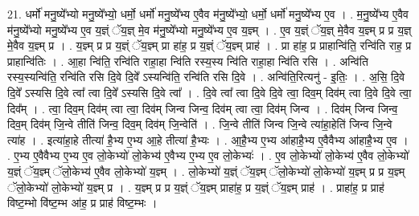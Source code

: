 \documentclass[17pt]{extarticle}
\begin{document}
21. धर्मो॑ मनु॒ष्ये᳚भ्यो मनु॒ष्ये᳚भ्यो॒ धर्मो॒ धर्मो॑ मनु॒ष्ये᳚भ्य ए॒वैव म॑नु॒ष्ये᳚भ्यो॒ धर्मो॒ धर्मो॑ मनु॒ष्ये᳚भ्य ए॒व । . म॒नु॒ष्ये᳚भ्य ए॒वैव म॑नु॒ष्ये᳚भ्यो मनु॒ष्ये᳚भ्य ए॒व य॒ज्ञ्ं ॅय॒ज्ञ् मे॒व म॑नु॒ष्ये᳚भ्यो 
मनु॒ष्ये᳚भ्य ए॒व य॒ज्ञ्म् । . ए॒व य॒ज्ञ्ं ॅय॒ज्ञ् मे॒वैव य॒ज्ञ्म् प्र प्र य॒ज्ञ् मे॒वैव य॒ज्ञ्म् प्र । . य॒ज्ञ्म् प्र प्र य॒ज्ञ्ं ॅय॒ज्ञ्म् प्रा हा॑ह॒ प्र य॒ज्ञ्ं ॅय॒ज्ञ्म् प्राह॑ । . प्रा हा॑ह॒ प्र प्राहान्वि॑ति॒ रन्वि॑ति राह॒ प्र प्राहान्वि॑तिः । . आ॒हा न्वि॑ति॒ रन्वि॑ति राहा॒हा न्वि॑ति रस्य॒स्य न्वि॑ति राहा॒हा न्वि॑ति रसि । . अन्वि॑ति रस्य॒स्यन्वि॑ति॒ रन्वि॑ति रसि दि॒वे दि॒वे᳚ ऽस्यन्वि॑ति॒ रन्वि॑ति रसि दि॒वे । . अन्वि॑ति॒रित्यनु॑ - इ॒तिः॒ । . अ॒सि॒ दि॒वे दि॒वे᳚ ऽस्यसि दि॒वे त्वा᳚ त्वा दि॒वे᳚ ऽस्यसि दि॒वे त्वा᳚ । . दि॒वे त्वा᳚ त्वा दि॒वे दि॒वे त्वा॒ दिव॒म् दिव॑म् त्वा दि॒वे दि॒वे त्वा॒ दिव᳚म् । . त्वा॒ दिव॒म् दिव॑म् त्वा त्वा॒ दिव॑म् जिन्व जिन्व॒ दिव॑म् त्वा त्वा॒ दिव॑म् जिन्व । . दिव॑म् जिन्व जिन्व॒ दिव॒म् दिव॑म् जि॒न्वे तीति॑ जिन्व॒ दिव॒म् दिव॑म् जि॒न्वेति॑ । . जि॒न्वे तीति॑ जिन्व जि॒न्वे त्या॑हा॒हेति॑ जिन्व जि॒न्वे त्या॑ह । . इत्या॑हा॒हे तीत्या॑ है॒भ्य ए॒भ्य आ॒हे तीत्या॑ है॒भ्यः । . आ॒है॒भ्य ए॒भ्य आ॑हाहै॒भ्य ए॒वैवैभ्य आ॑हाहै॒भ्य ए॒व । . ए॒भ्य ए॒वैवैभ्य ए॒भ्य ए॒व लो॒केभ्यो॑ लो॒केभ्य॑ ए॒वैभ्य ए॒भ्य ए॒व लो॒केभ्यः॑ । . ए॒व लो॒केभ्यो॑ लो॒केभ्य॑ ए॒वैव लो॒केभ्यो॑ य॒ज्ञ्ं ॅय॒ज्ञ्म् ॅलो॒केभ्य॑ ए॒वैव लो॒केभ्यो॑ य॒ज्ञ्म् । . लो॒केभ्यो॑ य॒ज्ञ्ं ॅय॒ज्ञ्म् ॅलो॒केभ्यो॑ लो॒केभ्यो॑ य॒ज्ञ्म् प्र प्र य॒ज्ञ्म् ॅलो॒केभ्यो॑ लो॒केभ्यो॑ य॒ज्ञ्म् प्र । . य॒ज्ञ्म् प्र प्र य॒ज्ञ्ं ॅय॒ज्ञ्म् प्राहा॑ह॒ प्र य॒ज्ञ्ं ॅय॒ज्ञ्म् प्राह॑ । . प्राहा॑ह॒ प्र प्राह॑ विष्ट॒म्भो वि॑ष्ट॒म्भ आ॑ह॒ प्र प्राह॑ विष्ट॒म्भः । \newline
\end{document}
